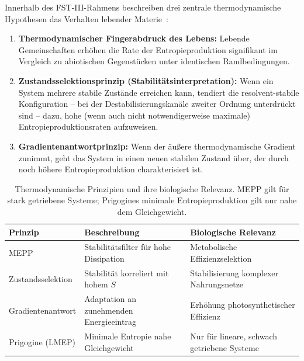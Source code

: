 \documentclass[12pt,a4paper]{article}
\theoremstyle{remark}
\begin{document}
Innerhalb des FST-III-Rahmens beschreiben drei zentrale thermodynamische Hypothesen das Verhalten lebender Materie~\citep{EcosystemMEPP}:

\begin{enumerate}
    \item \textbf{Thermodynamischer Fingerabdruck des Lebens:} Lebende Gemeinschaften erhöhen die Rate der Entropieproduktion signifikant im Vergleich zu abiotischen Gegenstücken unter identischen Randbedingungen.

    \item \textbf{Zustandsselektionsprinzip (Stabilitätsinterpretation):} Wenn ein System mehrere stabile Zustände erreichen kann, tendiert die resolvent-stabile Konfiguration -- bei der Destabilisierungskanäle zweiter Ordnung unterdrückt sind -- dazu, hohe (wenn auch nicht notwendigerweise maximale) Entropieproduktionsraten aufzuweisen.

    \item \textbf{Gradientenantwortprinzip:} Wenn der äußere thermodynamische Gradient zunimmt, geht das System in einen neuen stabilen Zustand über, der durch noch höhere Entropieproduktion charakterisiert ist.
\end{enumerate}

\begin{table}[htbp]
\centering
\caption{Thermodynamische Prinzipien und ihre biologische Relevanz. MEPP gilt für stark getriebene Systeme; Prigogines minimale Entropieproduktion gilt nur nahe dem Gleichgewicht.}
\label{tab:thermo-principles}
\begin{tabularx}{\textwidth}{@{}L{0.22\textwidth} L{0.28\textwidth} Y@{}}
\toprule
\textbf{Prinzip} & \textbf{Beschreibung} & \textbf{Biologische Relevanz} \\
\midrule
MEPP & Stabilitätsfilter für hohe Dissipation & Metabolische Effizienzselektion \\
Zustandsselektion & Stabilität korreliert mit hohem $\dot{S}$ & Stabilisierung komplexer Nahrungsnetze \\
Gradientenantwort & Adaptation an zunehmenden Energieeintrag & Erhöhung photosynthetischer Effizienz \\
Prigogine (LMEP) & Minimale Entropie nahe Gleichgewicht & Nur für lineare, schwach getriebene Systeme \\
\bottomrule
\end{tabularx}
\end{table}
\end{document}
